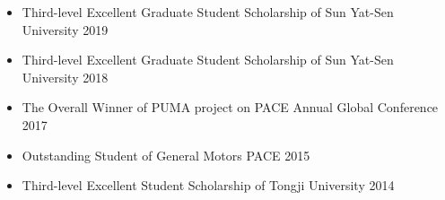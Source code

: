  \begin{itemize}[leftmargin=*]
       \small
       \setlength{\itemsep}{0pt}
       \item{Third-level Excellent Graduate Student Scholarship of Sun Yat-Sen University \hfill 2019}
       \item Third-level Excellent Graduate Student Scholarship of Sun Yat-Sen University \hfill 2018
       \item The Overall Winner of PUMA project on PACE Annual Global Conference \hfill 2017
       \item Outstanding Student of General Motors PACE \hfill 2015
       \item Third-level Excellent Student Scholarship of Tongji University \hfill 2014
  \end{itemize}
